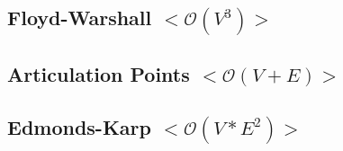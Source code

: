 \documentclass[10pt, a4paper, twoside, notitlepage]{article}
\begin{document}


\subsection{Floyd-Warshall $<\mathcal{O}(V^{3})>$}



\newpage

\subsection{Articulation Points $<\mathcal{O}(V+E)>$}



\newpage

\subsection{Edmonds-Karp $<\mathcal{O}(V*E^{2})>$}



\newpage
\end{document}
